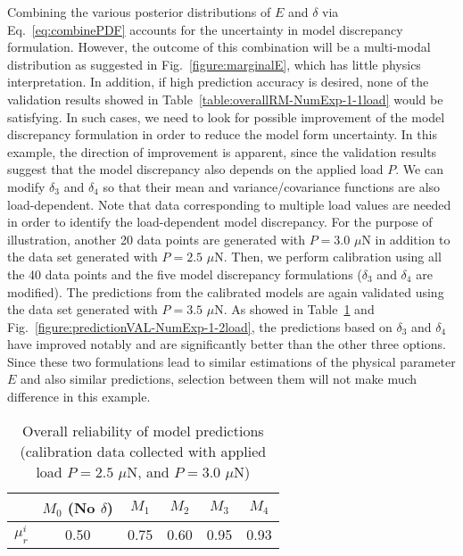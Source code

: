 \documentclass[preprint,review,12pt,3p]{elsarticle}
\begin{document}
Combining the various posterior distributions of $E$ and $\delta$ via Eq.~\ref{eq:combinePDF} accounts for the uncertainty in model discrepancy formulation. However, the outcome of this combination will be a multi-modal distribution as suggested in Fig.~\ref{figure:marginalE}, which has little physics interpretation. In addition, if high prediction accuracy is desired, none of the validation results showed in Table~\ref{table:overallRM-NumExp-1-1load} would be satisfying. In such cases, we need to look for possible improvement of the model discrepancy formulation in order to reduce the model form uncertainty. In this example, the direction of improvement is apparent, since the validation results suggest that the model discrepancy also depends on the applied load $P$. We can modify $\delta_3$ and $\delta_4$ so that their mean and variance/covariance functions are also load-dependent. Note that data corresponding to multiple load values are needed in order to identify the load-dependent model discrepancy. For the purpose of illustration, another 20 data points are generated with $P=3.0$ $\mu$N in addition to the data set generated with $P=2.5$ $\mu$N. Then, we perform calibration using all the 40 data points and the five model discrepancy formulations ($\delta_3$ and $\delta_4$ are modified). The predictions from the calibrated models are again validated using the data set generated with $P=3.5$ $\mu$N. As showed in Table~\ref{table:overallRM-NumExp-1-2load} and Fig.~\ref{figure:predictionVAL-NumExp-1-2load}, the predictions based on $\delta_3$ and $\delta_4$ have improved notably and are significantly better than the other three options. Since these two formulations lead to similar estimations of the physical parameter $E$ and also similar predictions, selection between them will not make much difference in this example.


\begin{table}[h!]
\caption{Overall reliability of model predictions (calibration data collected with applied load $P=2.5$ $\mu$N, and $P=3.0$ $\mu$N)}
\label{table:overallRM-NumExp-1-2load}
\begin{center}
\begin{tabular}{cccccc}
\hline
& $M_{0}$ (No $\delta$) & $M_1$ & $M_2$ & $M_3$ & $M_4$ \\
\hline
$\mu_r^i$ & 0.50 & 0.75 & 0.60 & 0.95 & 0.93 \\
\hline
\end{tabular}
\end{center}
\end{table}
\end{document}
